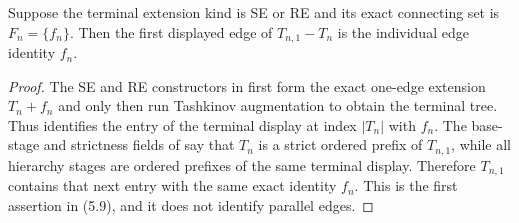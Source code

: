\begin{lemma}
Suppose the terminal extension kind is SE or RE and its exact connecting
set is $F_n=\{f_n\}$.  Then the first displayed edge of
$T_{n,1}-T_n$ is the individual edge identity $f_n$.
\end{lemma}
\begin{proof}
The SE and RE constructors in  first form
the exact one-edge extension $T_n+f_n$ and only then run Tashkinov
augmentation to obtain the terminal tree.  Thus
 identifies the entry of the terminal
display at index $|T_n|$ with $f_n$.  The base-stage and strictness
fields of  say that $T_n$ is a strict
ordered prefix of $T_{n,1}$, while all hierarchy stages are ordered
prefixes of the same terminal display.  Therefore $T_{n,1}$ contains
that next entry with the same exact identity $f_n$.  This is the first
assertion in (5.9), and it does not identify parallel edges.
\end{proof}
